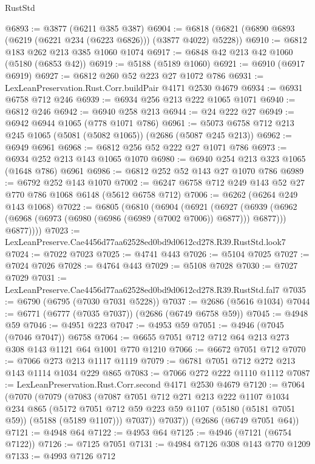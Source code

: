 \begin{lexlean}{RustStd}
\begin{coremodule}
@6893 := @3877 (@6211 @385 @387)
@6904 := @6818 (@6821 (@6890 @6893 (@6219 (@6221 @234 (@6223 @6826))) (@3877 @4022) @5228))
@6910 := @6812 @183 @262 @213 @385 @1060 @1074
@6917 := @6848 @42 @213 @42 @1060 (@5180 (@6853 @42))
@6919 := @5188 (@5189 @1060)
@6921 := @6910 (@6917 @6919)
@6927 := @6812 @260 @52 @223 @27 @1072 @786
@6931 := LexLeanPreservation.Rust.Corr.buildPair @4171 @2530 @4679
@6934 := @6931 @6758 @712 @246
@6939 := @6934 @256 @213 @222 @1065 @1071
@6940 := @6812 @246
@6942 := @6940 @258 @213
@6944 := @24 @222 @27
@6949 := @6942 @6944 @1065 (@778 @1071 @786)
@6961 := @5073 @6758 @712 @213 @245 @1065 (@5081 (@5082 @1065)) (@2686 (@5087 @245 @213))
@6962 := @6949 @6961
@6968 := @6812 @256 @52 @222 @27 @1071 @786
@6973 := @6934 @252 @213 @143 @1065 @1070
@6980 := @6940 @254 @213 @323 @1065 (@1648 @786) @6961
@6986 := @6812 @252 @52 @143 @27 @1070 @786
@6989 := @6792 @252 @143 @1070
@7002 := @6247 @6758 @712 @249 @143 @52 @27 @770 @786 @1068 @6148 (@5612 @6758 @712)
@7006 := @6262 (@6264 @249 @143 @1068)
@7022 := @6805
    (@6810
      (@6904
        (@6921
          (@6927
            (@6939 (@6962 (@6968 (@6973 (@6980 (@6986 (@6989 (@7002 @7006)) @6877))) @6877)))
            @6877))))
@7023 := LexLeanPreserve.Cae4456d77aa62528ed0bd9d0612cd278.R39.RustStd.look7
@7024 := @7022 @7023
@7025 := @4741 @443
@7026 := @5104 @7025
@7027 := @7024 @7026
@7028 := @4764 @443
@7029 := @5108 @7028
@7030 := @7027 @7029
@7031 := LexLeanPreserve.Cae4456d77aa62528ed0bd9d0612cd278.R39.RustStd.fal7
@7035 := @6790 (@6795 (@7030 @7031 @5228))
@7037 := @2686 (@5616 @1034)
@7044 := @6771 (@6777 (@7035 @7037)) (@2686 (@6749 @6758 @59))
@7045 := @4948 @59
@7046 := @4951 @223
@7047 := @4953 @59
@7051 := @4946 (@7045 (@7046 @7047)) @6758
@7064 := @6655 @7051 @712 @712 @64 @213 @273 @308 @143 @1121 @64 @1001 @770 @1210
@7066 := @6672 @7051 @712
@7070 := @7066 @273 @213 @1117 @1119
@7079 := @6781 @7051 @712 @272 @213 @143 @1114 @1034 @229 @865
@7083 := @7066 @272 @222 @1110 @1112
@7087 := LexLeanPreservation.Rust.Corr.second @4171 @2530 @4679
@7120 := @7064
    (@7070
      (@7079
        (@7083
          (@7087
            @7051
            @712
            @271
            @213
            @222
            @1107
            @1034
            @234
            @865
            (@5172 @7051 @712 @59 @223 @59 @1107 (@5180 (@5181 @7051 @59)) (@5188 (@5189 @1107)))
            @7037))
        @7037))
    (@2686 (@6749 @7051 @64))
@7121 := @4948 @64
@7122 := @4953 @64
@7125 := @4946 (@7121 (@6754 @7122))
@7126 := @7125 @7051
@7131 := @4984 @7126 @308 @143 @770 @1209
@7133 := @4993 @7126 @712

\end{coremodule}
\end{lexlean}
